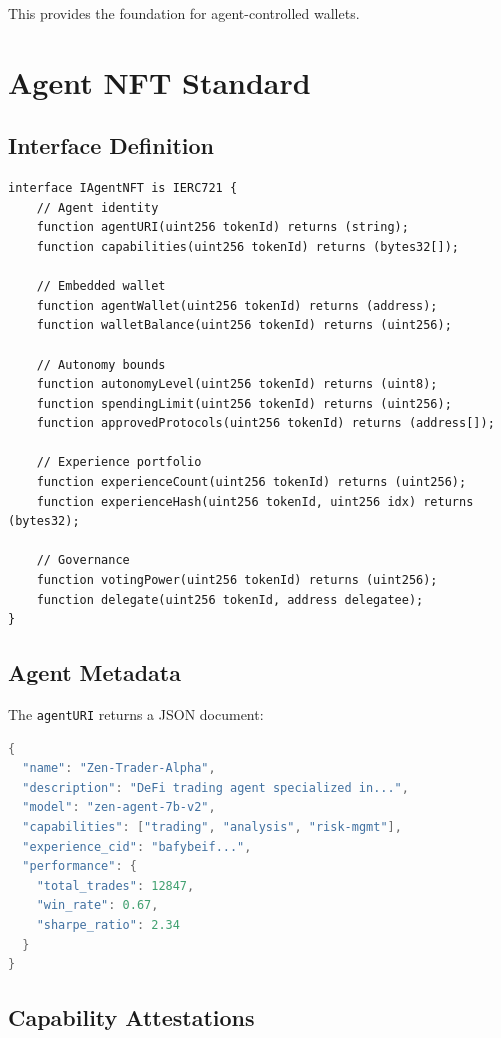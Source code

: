 \documentclass[11pt,letterpaper]{article}
\begin{document}
This provides the foundation for agent-controlled wallets.

\section{Agent NFT Standard}
\label{sec:standard}

\subsection{Interface Definition}

\begin{lstlisting}[style=solidity]
interface IAgentNFT is IERC721 {
    // Agent identity
    function agentURI(uint256 tokenId) returns (string);
    function capabilities(uint256 tokenId) returns (bytes32[]);

    // Embedded wallet
    function agentWallet(uint256 tokenId) returns (address);
    function walletBalance(uint256 tokenId) returns (uint256);

    // Autonomy bounds
    function autonomyLevel(uint256 tokenId) returns (uint8);
    function spendingLimit(uint256 tokenId) returns (uint256);
    function approvedProtocols(uint256 tokenId) returns (address[]);

    // Experience portfolio
    function experienceCount(uint256 tokenId) returns (uint256);
    function experienceHash(uint256 tokenId, uint256 idx) returns (bytes32);

    // Governance
    function votingPower(uint256 tokenId) returns (uint256);
    function delegate(uint256 tokenId, address delegatee);
}
\end{lstlisting}

\subsection{Agent Metadata}

The \texttt{agentURI} returns a JSON document:

\begin{lstlisting}[language=Java,basicstyle=\ttfamily\small]
{
  "name": "Zen-Trader-Alpha",
  "description": "DeFi trading agent specialized in...",
  "model": "zen-agent-7b-v2",
  "capabilities": ["trading", "analysis", "risk-mgmt"],
  "experience_cid": "bafybeif...",
  "performance": {
    "total_trades": 12847,
    "win_rate": 0.67,
    "sharpe_ratio": 2.34
  }
}
\end{lstlisting}

\subsection{Capability Attestations}
\end{document}
